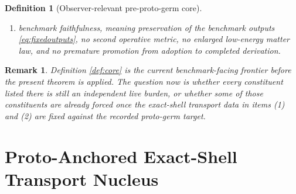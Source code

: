 \documentclass[11pt]{article}
\newcommand{\ProtoCharge}[1]{\mathcal Q_{#1}^{\mathrm{proto}}}
\newcommand{\ProtoEmbed}[1]{\zeta_{#1}^{\mathrm{proto}}}
\newcommand{\ProtoKernelCh}[1]{\widetilde K_{#1}^{0,\mathrm{proto}}}
\newcommand{\ProtoStateComp}[1]{P_{#1}^{\mathrm{proto,co}}}
\newcommand{\PreProtoProj}[1]{\Pi_{#1}^{\mathrm{preproto}}}
\newcommand{\PreProtoZeroCore}[1]{\mathcal Z_{#1}^{0,\mathrm{preproto}}}
\newcommand{\PreProtoCharge}[1]{\mathcal Q_{#1}^{\mathrm{preproto}}}
\newcommand{\PreProtoEmbed}[1]{\zeta_{#1}^{\mathrm{preproto}}}
\newtheorem{definition}{Definition}
\newtheorem{remark}{Remark}
\begin{document}
\begin{definition}[Observer-relevant pre-proto-germ core]
\begin{enumerate}
    \[
    \ProtoCharge{\sigma}
    =
    \PreProtoCharge{\sigma},
    \qquad
    \ProtoEmbed{\sigma}
    =
    \PreProtoProj{\sigma}\circ\PreProtoEmbed{\sigma},
    \]
    and projecting through
    \[
    \PreProtoProj{\sigma}\big|_{\PreProtoZeroCore{\sigma}}
    \]
    to the fixed proto-germ kernel chart \(\ProtoKernelCh{\sigma}\) and orthogonal projector \(\ProtoStateComp{\sigma}\);
    \item benchmark faithfulness, meaning preservation of the benchmark outputs \eqref{eq:fixedoutputs}, no second operative metric, no enlarged low-energy matter law, and no premature promotion from adoption to completed derivation.
\end{enumerate}
\end{definition}

\begin{remark}
Definition \ref{def:core} is the current benchmark-facing frontier before the present theorem is applied. The question now is whether every constituent listed there is still an independent live burden, or whether some of those constituents are already forced once the exact-shell transport data in items (1) and (2) are fixed against the recorded proto-germ target.
\end{remark}

\section{Proto-Anchored Exact-Shell Transport Nucleus}
\end{document}
